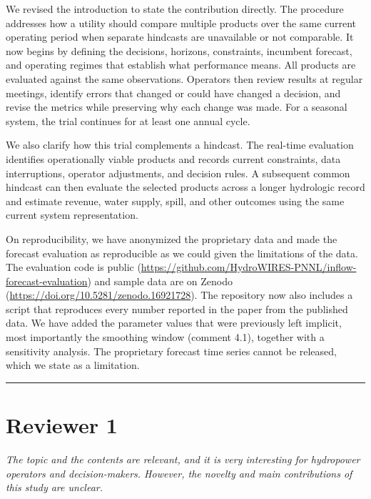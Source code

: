 \documentclass[11pt]{article}
\newenvironment{rc}%
  {\begin{list}{}{\setlength{\leftmargin}{1.5em}\setlength{\rightmargin}{1.5em}%
   \setlength{\topsep}{0.2em}\setlength{\parsep}{0pt}\setlength{\itemsep}{0pt}}%
   \item[]\itshape\color{quotegray}}%
  {\end{list}}
\begin{document}
We revised the introduction to state the contribution directly. The procedure addresses how a
utility should compare multiple products over the same current operating period when separate
hindcasts are unavailable or not comparable. It now begins by defining the decisions, horizons,
constraints, incumbent forecast, and operating regimes that establish what performance means.
All products are evaluated against the same observations. Operators then review results at regular
meetings, identify errors that changed or could have changed a decision, and revise the metrics
while preserving why each change was made. For a seasonal system, the trial continues for at
least one annual cycle.

We also clarify how this trial complements a hindcast. The real-time evaluation identifies
operationally viable products and records current constraints, data interruptions, operator
adjustments, and decision rules. A subsequent common hindcast can then evaluate the selected
products across a longer hydrologic record and estimate revenue, water supply, spill, and other
outcomes using the same current system representation.

On reproducibility, we have anonymized the proprietary data and made the forecast evaluation as
reproducible as we could given the limitations of the data. The evaluation code is public
(\url{https://github.com/HydroWIRES-PNNL/inflow-forecast-evaluation}) and sample data are
on Zenodo (\url{https://doi.org/10.5281/zenodo.16921728}). The repository now also includes a
script that reproduces every number reported in the paper from the published data. We have
added the parameter values that were previously left implicit, most importantly the smoothing
window (comment 4.1), together with a sensitivity analysis. The proprietary forecast time
series cannot be released, which we state as a limitation.

\vspace{0.4em}
\hrule
\vspace{0.4em}

\section*{Reviewer 1}

\begin{rc}
The topic and the contents are relevant, and it is very interesting for hydropower
operators and decision-makers. However, the novelty and main contributions of this
study are unclear.
\end{rc}
\end{document}
